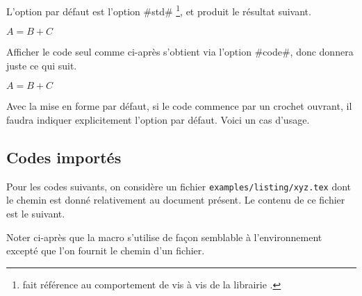 \documentclass[12pt, a4paper]{article}
\begin{document}
\begin{bdocexa}[À la suite]
    L'option par défaut est l'option \bdocinlatex#std#
    \footnote{
         fait référence au comportement  de  vis à vis de la librairie .
    },
    et  produit le résultat suivant.

    \begin{bdoclatex}
        $A = B + C$
    \end{bdoclatex}
\end{bdocexa}




\begin{bdocexa}
    Afficher le code seul comme ci-après s'obtient via l'option \bdocinlatex#code#, donc  donnera juste ce qui suit.

    \begin{bdoclatex}[code]
        $A = B + C$
    \end{bdoclatex}
\end{bdocexa}




\begin{bdocwarn}
    Avec la mise en forme par défaut, si le code commence par un crochet ouvrant, il faudra indiquer explicitement l'option par défaut. Voici un cas d'usage.

\end{bdocwarn}



\subsection{Codes importés}

Pour les codes suivants, on considère un fichier \verb+examples/listing/xyz.tex+ dont le chemin est donné relativement au document présent.
Le contenu de ce fichier est le suivant.


\medskip

Noter ci-après que la macro  s'utilise de façon semblable à l'environnement  excepté que l'on fournit le chemin d'un fichier.
\end{document}
